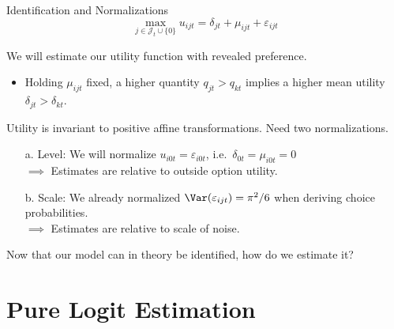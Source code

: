 \documentclass[aspectratio=169,t,11pt,table]{beamer}
\begin{document}
\begin{frame}{Identification and Normalizations}
    \vspace{-\baselineskip}
    \begin{equation*}
        \max_{j \in \mathcal{J}_t \cup \{0\}} u_{ijt} = \delta_{jt} + \mu_{ijt} + \varepsilon_{ijt}
    \end{equation*}
    \vspace{-0.5\baselineskip}
    \begin{wideitemize}
        \item We will estimate our utility function with \alert{revealed preference}.
        \begin{itemize}
            \item Holding $\mu_{ijt}$ fixed, a higher quantity $q_{jt} > q_{kt}$ implies a higher mean utility $\delta_{jt} > \delta_{kt}$.
        \end{itemize}
        \pause
        \item Utility is invariant to positive affine transformations. Need two normalizations.
        \pause
        \begin{enumerate}
            \item[a.] \alert{Level}: We will normalize $u_{i0t} = \varepsilon_{i0t}$, i.e.\ $\delta_{0t} = \mu_{i0t} = 0$ \\ $\implies$ Estimates are relative to outside option utility.
            \pause
            \item[b.] \alert{Scale}: We already normalized $\Var(\varepsilon_{ijt}) = \pi^2 / 6$ when deriving choice probabilities. \\ $\implies$ Estimates are relative to scale of noise.
        \end{enumerate}
        \pause
        \item Now that our model can in theory be identified, how do we estimate it?
    \end{wideitemize}
\end{frame}

\section{Pure Logit Estimation}
\end{document}
